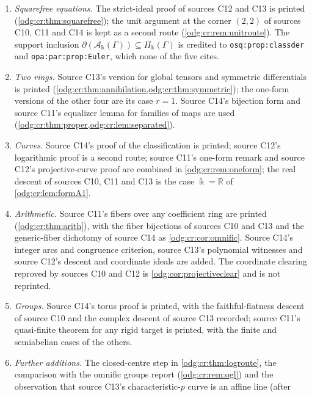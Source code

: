 \documentclass[11pt,oneside]{article}
\numberwithin{equation}{section}
\theoremstyle{definition}
\theoremstyle{remark}
\newcommand{\R}{\mathbb R}
\newcommand{\replabel}[1]{\nolinkurl{#1}}
\newcommand{\crA}{\mathcal A_\Bbbk(\Gamma)}
\newcommand{\crP}{\Pi_\Bbbk(\Gamma)}
\begin{document}
\begin{enumerate}[leftmargin=*]
printed for every $\Bbbk$ and $\Gamma$
(\cref{odg:cr:thm:annihilation,odg:cr:cor:generalweierstrass,odg:cr:cor:allcurves,odg:cr:thm:groupkernel});
source C11's arithmetic fibers extend to every $\Bbbk$ by the classification
(\cref{odg:cr:thm:arith}). These extensions use the sources' own proofs.
\item \emph{Squarefree equations.} The strict-ideal proof of sources C12 and C13 is
printed (\cref{odg:cr:thm:squarefree}); the unit argument at the corner $(2,2)$ of
sources C10, C11 and C14 is kept as a second route (\cref{odg:cr:rem:unitroute}).
The support inclusion $\partial(\crA)\subseteq\crP$ is credited to
\replabel{osq:prop:classder} and \replabel{opa:par:prop:Euler}, which none of the five
cites.
\item \emph{Two rings.} Source C13's version for global tensors and symmetric
differentials is printed (\cref{odg:cr:thm:annihilation,odg:cr:thm:symmetric}); the
one-form versions of the other four are its case $r=1$. Source C14's bijection form
and source C11's equalizer lemma for families of maps are used
(\cref{odg:cr:thm:proper,odg:cr:lem:separated}).
\item \emph{Curves.} Source C14's proof of the classification is printed; source C12's
logarithmic proof is a second route; source C11's one-form remark and source C12's
projective-curve proof are combined in \cref{odg:cr:rem:oneform}; the real descent of
sources C10, C11 and C13 is the case $\Bbbk=\R$ of \cref{odg:cr:lem:formA1}.
\item \emph{Arithmetic.} Source C11's fibers over any coefficient ring are printed
(\cref{odg:cr:thm:arith}), with the fiber bijections of sources C10 and C13 and the
generic-fiber dichotomy of source C14 as \cref{odg:cr:cor:omnific}. Source C14's
integer arcs and congruence criterion, source C13's polynomial witnesses and source
C12's descent and coordinate ideals are added. The coordinate clearing reproved by
sources C10 and C12 is \cref{odg:cor:projectiveclear} and is not reprinted.
\item \emph{Groups.} Source C14's torus proof is printed, with the faithful-flatness
descent of source C10 and the complex descent of source C13 recorded; source C11's
quasi-finite theorem for any rigid target is printed, with the finite and semiabelian
cases of the others.
\item \emph{Further additions.} The closed-centre step in \cref{odg:cr:thm:logroute},
the comparison with the omnific groups report (\cref{odg:cr:rem:ogl}) and the
observation that source C13's characteristic-$p$ curve is an affine line (after

\end{enumerate}
\end{document}
